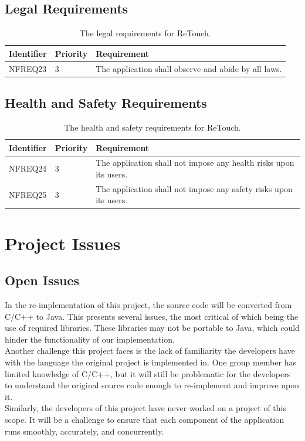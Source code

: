 \documentclass[12pt, titlepage]{article}
\begin{document}
\subsection{Legal Requirements}

\begin{table}[H]
  \caption{The legal requirements for ReTouch.}
\begin{tabular}{ |m{2cm}|m{1.8cm}|m{9.4cm}| }
    \hline
    \textbf{Identifier} & \textbf{Priority} & \textbf{Requirement} \\ 
    \hline
    NFREQ23 & 3 & The application shall observe and abide by all laws. \\
    \hline
\end{tabular}
\end{table}

\subsection{Health and Safety Requirements}

\begin{table}[H]
  \caption{The health and safety requirements for ReTouch.}
\begin{tabular}{ |m{2cm}|m{1.8cm}|m{9.4cm}| }
    \hline
    \textbf{Identifier} & \textbf{Priority} & \textbf{Requirement} \\ 
    \hline
    NFREQ24 & 3 & The application shall not impose any health risks upon its users. \\
    \hline
    NFREQ25 & 3 & The application shall not impose any safety risks upon its users. \\
    \hline
\end{tabular}
\end{table}

\section{Project Issues}
\subsection{Open Issues}
\indent \indent In the re-implementation of this project, the source code will be converted from C/C++ to Java. This presents several issues, the most critical of which being the use of required libraries. These libraries may not be portable to Java, which could hinder the functionality of our implementation. 
\\
\indent Another challenge this project faces is the lack of familiarity the developers have with the language the original project is implemented in. One group member has limited knowledge of C/C++, but it will still be problematic for the developers to understand the original source code enough to re-implement and improve upon it.
\\
\indent Similarly, the developers of this project have never worked on a project of this scope. It will be a challenge to ensure that each component of the application runs smoothly, accurately, and concurrently.
\end{document}
